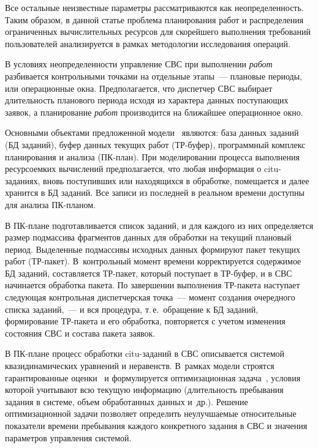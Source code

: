 \begin{multicols}{2}
Все остальные неизвестные параметры рас\-смат\-ри\-ва\-ют\-ся как
неопределенность. Таким образом, в данной статье проблема
планирования работ и  распределения ограниченных вычислительных
ресурсов  для скорейшего выполнения требований пользователей
анализируется в рамках методологии исследо\-вания операций.

В условиях неопределенности управление СВС  при выполнении
\textit{работ} разбивается контрольными точками на отдельные этапы~---
плановые периоды, или операционные окна. Предполагается, что
диспетчер СВС выбирает  длительность планового периода исходя из
характера данных поступающих заявок, а планирование \textit{работ}
производится на ближайшее операционное окно.


Основными  объектами предложенной модели~\cite{Inf1-13, Prep1-13}
являются: база данных заданий (БД заданий),  буфер данных текущих
работ (ТР-бу\-фер), программный комплекс планирования и анализа
(ПК-план). При моделировании  процесса выполнения ресурсоемких
вычислений предполагается, что любая информация о citu-заданиях,
вновь поступивших или находящихся в обработке, помещается и далее
хранится в БД заданий. Все записи из последней  в реальном времени
доступны для анализа  ПК-планом.

В ПК-плане подготавливается список заданий, и для каждого из них
определяется размер подмассива фрагментов данных для обработки на
текущий плановый период. Выделенные подмассивы исходных данных
формируют пакет текущих работ (ТР-па\-кет). В~контрольный момент
времени корректируется содержимое БД заданий, составляется ТР-па\-кет,
который поступает в  ТР-бу\-фер,  и  в СВС начинается обработка
пакета. По завершении выполнения ТР-па\-ке\-та наступает следующая
контрольная диспетчерская точка~---  момент создания очередного списка
заданий,~--- и вся процедура, т.\,е.\ обращение к БД заданий,
формирование ТР-па\-ке\-та и его обработка, повторяется с учетом
изменения состояния СВС и со\-ста\-ва пакета заявок.

В ПК-плане процесс обработки citu-за\-да\-ний в СВС описывается сис\-те\-мой
квазидинамических уравнений и неравенств. В~рамках модели строятся
гарантированные оценки~\cite{germ} и формулируется оптимизационная
задача~\cite{Suh}, условия которой учитывают всю текущую информацию
(длительность пребывания задания в системе, объем обработанных
данных и~др.). Решение оптимизационной задачи позволяет определить
неулучшаемые относительные показатели времени пребывания каждого
конкретного задания в СВС и значения параметров управления сис\-темой.


\end{multicols}
